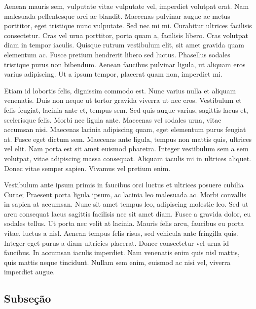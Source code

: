 Aenean mauris sem, vulputate vitae vulputate vel, imperdiet volutpat erat. Nam malesuada pellentesque orci ac blandit. Maecenas pulvinar augue ac metus porttitor, eget tristique nunc vulputate. Sed nec mi mi. Curabitur ultrices facilisis consectetur. Cras vel urna porttitor, porta quam a, facilisis libero. Cras volutpat diam in tempor iaculis. Quisque rutrum vestibulum elit, sit amet gravida quam elementum ac. Fusce pretium hendrerit libero sed luctus. Phasellus sodales tristique purus non bibendum. Aenean faucibus pulvinar ligula, ut aliquam eros varius adipiscing. Ut a ipsum tempor, placerat quam non, imperdiet mi.

Etiam id lobortis felis, dignissim commodo est. Nunc varius nulla et aliquam venenatis. Duis non neque ut tortor gravida viverra ut nec eros. Vestibulum et felis feugiat, lacinia ante et, tempus sem. Sed quis augue varius, sagittis lacus et, scelerisque felis. Morbi nec ligula ante. Maecenas vel sodales urna, vitae accumsan nisi. Maecenas lacinia adipiscing quam, eget elementum purus feugiat at. Fusce eget dictum sem. Maecenas ante ligula, tempus non mattis quis, ultrices vel elit. Nam porta est sit amet euismod pharetra. Integer vestibulum sem a sem volutpat, vitae adipiscing massa consequat. Aliquam iaculis mi in ultrices aliquet. Donec vitae semper sapien. Vivamus vel pretium enim.

Vestibulum ante ipsum primis in faucibus orci luctus et ultrices posuere cubilia Curae; Praesent porta ligula ipsum, ac lacinia leo malesuada ac. Morbi convallis in sapien at accumsan. Nunc sit amet tempus leo, adipiscing molestie leo. Sed ut arcu consequat lacus sagittis facilisis nec sit amet diam. Fusce a gravida dolor, eu sodales tellus. Ut porta nec velit at lacinia. Mauris felis arcu, faucibus eu porta vitae, luctus a nisl. Aenean tempus felis risus, sed vehicula ante fringilla quis. Integer eget purus a diam ultricies placerat. Donec consectetur vel urna id faucibus. In accumsan iaculis imperdiet. Nam venenatis enim quis nisl mattis, quis mattis neque tincidunt. Nullam sem enim, euismod ac nisi vel, viverra imperdiet augue.

\subsection{Subse\c{c}\~{a}o}
\label{sec:subsec02}

